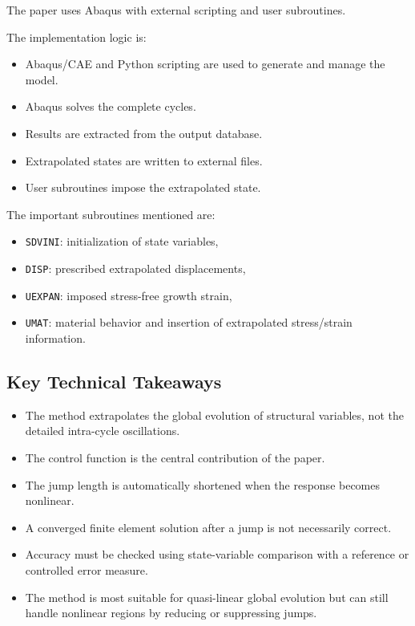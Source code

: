 ﻿\documentclass[11pt,a4paper]{article}
\begin{document}
The paper uses Abaqus with external scripting and user subroutines.

The implementation logic is:

\begin{itemize}[leftmargin=*]
    \item Abaqus/CAE and Python scripting are used to generate and manage the model.
    \item Abaqus solves the complete cycles.
    \item Results are extracted from the output database.
    \item Extrapolated states are written to external files.
    \item User subroutines impose the extrapolated state.
\end{itemize}

The important subroutines mentioned are:

\begin{itemize}[leftmargin=*]
    \item \texttt{SDVINI}: initialization of state variables,
    \item \texttt{DISP}: prescribed extrapolated displacements,
    \item \texttt{UEXPAN}: imposed stress-free growth strain,
    \item \texttt{UMAT}: material behavior and insertion of extrapolated stress/strain information.
\end{itemize}

\subsection{Key Technical Takeaways}

\begin{itemize}[leftmargin=*]
    \item The method extrapolates the global evolution of structural variables, not the detailed intra-cycle oscillations.
    \item The control function is the central contribution of the paper.
    \item The jump length is automatically shortened when the response becomes nonlinear.
    \item A converged finite element solution after a jump is not necessarily correct.
    \item Accuracy must be checked using state-variable comparison with a reference or controlled error measure.
    \item The method is most suitable for quasi-linear global evolution but can still handle nonlinear regions by reducing or suppressing jumps.
\end{itemize}
\end{document}
